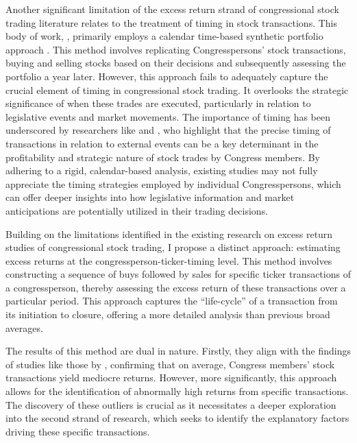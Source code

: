 \documentclass[15pt,letterpaper]{article}
\begin{document}
Another significant limitation of the excess return strand of congressional stock trading literature relates to the treatment of timing in stock transactions. This body of work, \cite{zi24, zi11, eg13}, primarily employs a calendar time-based synthetic portfolio approach \citep{syn1, syn2}. This method involves replicating Congresspersons’ stock transactions, buying and selling stocks based on their decisions and subsequently assessing the portfolio a year later. However, this approach fails to adequately capture the crucial element of timing in congressional stock trading. It overlooks the strategic significance of when these trades are executed, particularly in relation to legislative events and market movements. The importance of timing has been underscored by researchers like \cite{schweizer2011} and \citep{tahoun2014}, who highlight that the precise timing of transactions in relation to external events can be a key determinant in the profitability and strategic nature of stock trades by Congress members. By adhering to a rigid, calendar-based analysis, existing studies may not fully appreciate the timing strategies employed by individual Congresspersons, which can offer deeper insights into how legislative information and market anticipations are potentially utilized in their trading decisions.

Building on the limitations identified in the existing research on excess return studies of congressional stock trading, I propose a distinct approach: estimating excess returns at the congressperson-ticker-timing level. This method involves constructing a sequence of buys followed by sales for specific ticker transactions of a congressperson, thereby assessing the excess return of these transactions over a particular period. This approach captures the ``life-cycle'' of a transaction from its initiation to closure, offering a more detailed analysis than previous broad averages.

The results of this method are dual in nature. Firstly, they align with the findings of studies like those by \cite{eg13}, confirming that on average, Congress members' stock transactions yield mediocre returns. However, more significantly, this approach allows for the identification of abnormally high returns from specific transactions. The discovery of these outliers is crucial as it necessitates a deeper exploration into the second strand of research, which seeks to identify the explanatory factors driving these specific transactions. 

\end{document}
